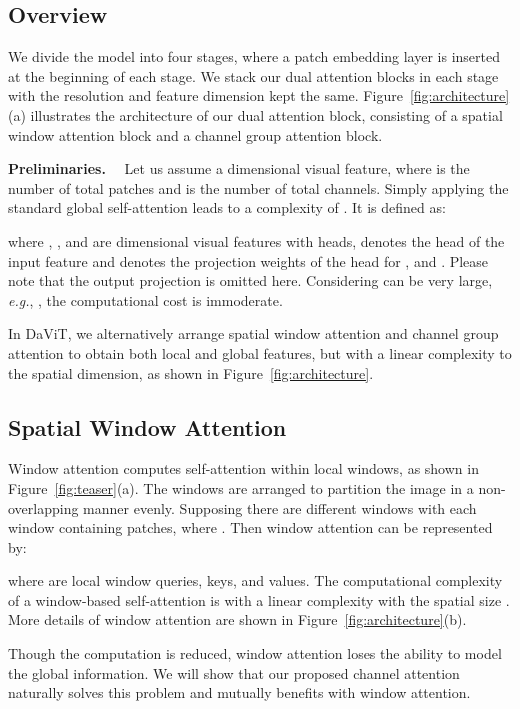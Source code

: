 \documentclass[runningheads]{llncs}
\newcommand{\eg}{\emph{e.g.}}
\newcommand{\model}{DaViT\xspace}
\begin{document}
\subsection{Overview}
We divide the model into four stages, where a patch embedding layer is inserted at the beginning of each stage. We stack our dual attention blocks in each stage with the resolution and feature dimension kept the same. Figure~\ref{fig:architecture}(a) illustrates the architecture of our dual attention block, consisting of a spatial window attention block and a channel group attention block.

\noindent \textbf{Preliminaries.}~~
Let us assume a  dimensional visual feature, 
where  is the number of total patches and  is the number of total channels. 
Simply applying the standard global self-attention leads to a complexity of .
It is defined as:

where , , and  are  dimensional visual features with  heads,  denotes the  head of the input feature and  denotes the projection weights of the  head for , and .
Please note that the output projection  is omitted here.
Considering  can be very large, \eg, , the computational cost is immoderate.

In \model, we alternatively arrange spatial window attention and channel group attention to obtain both local and global features, but with a linear complexity to the spatial dimension, as shown in Figure~\ref{fig:architecture}.


\subsection{Spatial Window Attention}
Window attention computes self-attention within local windows, as shown in Figure~\ref{fig:teaser}(a). The windows are arranged to partition the image in a non-overlapping manner evenly. Supposing there are  different windows with each window containing  patches, where .
Then window attention can be represented by:

where  are local window queries, keys, and values.
The computational complexity of a window-based self-attention is  with a linear complexity with the spatial size . More details of window attention are shown in Figure~\ref{fig:architecture}(b).

Though the computation is reduced, window attention loses the ability to model the global information.
We will show that our proposed channel attention naturally solves this problem and mutually benefits with window attention.
\end{document}
